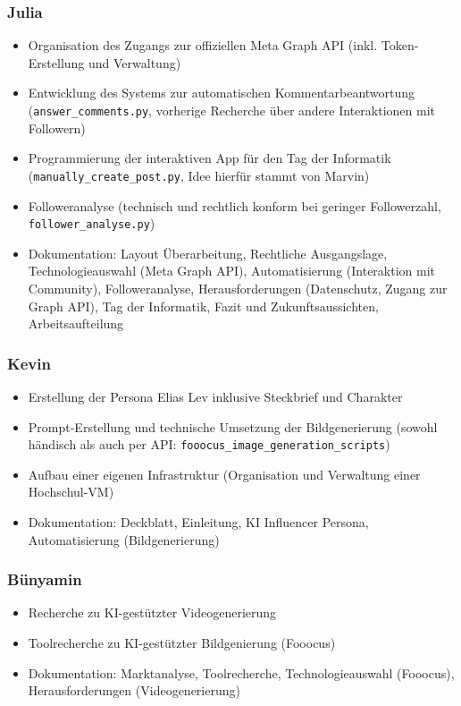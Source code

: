 \documentclass[a4paper,12pt]{article}
\begin{document}
\subsubsection*{Julia}

\begin{itemize}
    \item Organisation des Zugangs zur offiziellen Meta Graph API (inkl. Token-Erstellung und Verwaltung)
    \item Entwicklung des Systems zur automatischen Kommentarbeantwortung (\texttt{answer\_comments.py}, vorherige Recherche über andere Interaktionen mit Followern)
    \item Programmierung der interaktiven App für den Tag der Informatik (\texttt{manually\_create\_post.py}, Idee hierfür stammt von Marvin)
    \item Followeranalyse (technisch und rechtlich konform bei geringer Followerzahl, \texttt{follower\_analyse.py})
    \item Dokumentation: Layout Überarbeitung, Rechtliche Ausgangslage, Technologieauswahl (Meta Graph API), Automatisierung (Interaktion mit Community), Followeranalyse, Herausforderungen (Datenschutz, Zugang zur Graph API), Tag der Informatik, Fazit und Zukunftsaussichten, Arbeitsaufteilung
\end{itemize}

\subsubsection*{Kevin}

\begin{itemize}
    \item Erstellung der Persona Elias Lev inklusive Steckbrief und Charakter
    \item Prompt-Erstellung und technische Umsetzung der Bildgenerierung (sowohl händisch als auch per API: \texttt{fooocus\_image\_generation\_scripts})
    \item Aufbau einer eigenen Infrastruktur (Organisation und Verwaltung einer Hochschul-VM)
    \item Dokumentation: Deckblatt, Einleitung, KI Influencer Persona, Automatisierung (Bildgenerierung)
\end{itemize}

\subsubsection*{Bünyamin}

\begin{itemize}
    \item Recherche zu KI-gestützter Videogenerierung
    \item Toolrecherche zu KI-gestützter Bildgenierung (Fooocus)
    \item Dokumentation: Marktanalyse, Toolrecherche, Technologieauswahl (Fooocus), Herausforderungen (Videogenerierung)
\end{itemize}
\end{document}
